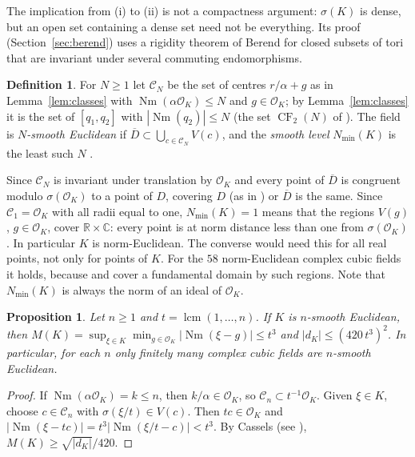 \documentclass[11pt]{amsart}
\newtheorem{proposition}[theorem]{Proposition}
\theoremstyle{definition}
\newtheorem{definition}[theorem]{Definition}
\theoremstyle{remark}
\numberwithin{equation}{section}
\newcommand{\R}{\mathbb{R}}
\newcommand{\C}{\mathbb{C}}
\newcommand{\cO}{\mathcal{O}}
\newcommand{\Nm}{\operatorname{Nm}}
\newcommand{\CF}{\operatorname{CF}}
\newcommand{\Nmin}{N_{\min}}
\begin{document}
The implication from (i) to (ii) is not a compactness argument: $\sigma(K)$ is dense, but an
open set containing a dense set need not be everything. Its proof
(Section~\ref{sec:berend}) uses a rigidity theorem of Berend for closed subsets of tori that are
invariant under several commuting endomorphisms.

\begin{definition}
For $N\ge1$ let $\mathcal C_N$ be the set of centres $r/\alpha+g$ as in Lemma~\ref{lem:classes}
with $\Nm(\alpha\cO_K)\le N$ and $g\in\cO_K$; by Lemma~\ref{lem:classes} it is the set of
$[q_1,q_2]$ with $|\Nm(q_2)|\le N$ (the set $\CF_2(N)$ of \cite[\S4]{GM}). The field is
\emph{$N$-smooth Euclidean} if $\overline D\subset\bigcup_{c\in\mathcal C_N}V(c)$, and the
\emph{smooth level} $\Nmin(K)$ is the least such $N$ \cite[\S4]{GM}.
\end{definition}

Since $\mathcal C_N$ is invariant under translation by $\cO_K$ and every point of $\overline D$
is congruent modulo $\sigma(\cO_K)$ to a point of $D$, covering $D$ (as in \cite{GM}) or
$\overline D$ is the same. Since $\mathcal C_1=\cO_K$ with all radii equal to one, $\Nmin(K)=1$
means that the regions $V(g)$, $g\in\cO_K$, cover $\R\times\C$: every point is at norm
distance less than one from $\sigma(\cO_K)$. In particular $K$ is norm-Euclidean. The converse
would need this for all real points, not only for points of $K$. For the $58$ norm-Euclidean
complex cubic fields it holds, because \cite{CL} and \cite[\S6]{BBT} cover a fundamental domain
by such regions. Note that $\Nmin(K)$ is always the norm of an ideal of $\cO_K$.

\begin{proposition}\label{prop:finite-smooth}
Let $n\ge1$ and $t=\operatorname{lcm}(1,\dots,n)$. If $K$ is $n$-smooth Euclidean, then
$M(K)=\sup_{\xi\in K}\min_{g\in\cO_K}|\Nm(\xi-g)|\le t^3$ and $|d_K|\le(420\,t^3)^2$. In
particular, for each $n$ only finitely many complex cubic fields are $n$-smooth Euclidean.
\end{proposition}

\begin{proof}
If $\Nm(\alpha\cO_K)=k\le n$, then $k/\alpha\in\cO_K$, so $\mathcal C_n\subset t^{-1}\cO_K$. Given
$\xi\in K$, choose $c\in\mathcal C_n$ with $\sigma(\xi/t)\in V(c)$. Then $tc\in\cO_K$ and
$|\Nm(\xi-tc)|=t^3|\Nm(\xi/t-c)|<t^3$. By Cassels \cite[Theorem~5]{Ca} (see
\cite[Remark~1.2]{BBT}), $M(K)\ge\sqrt{|d_K|}/420$.
\end{proof}
\end{document}
